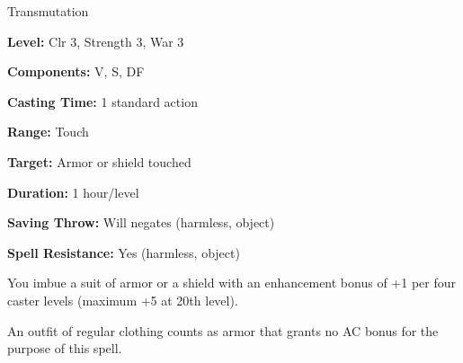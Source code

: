 
Transmutation

\textbf{Level:} Clr 3, Strength 3, War 3

\textbf{Components:} V, S, DF

\textbf{Casting Time:} 1 standard action

\textbf{Range:} Touch

\textbf{Target:} Armor or shield touched

\textbf{Duration:} 1 hour/level

\textbf{Saving Throw:} Will negates (harmless, object)

\textbf{Spell Resistance:} Yes (harmless, object)

You imbue a suit of armor or a shield with an enhancement bonus of +1 per four 
caster levels (maximum +5 at 20th level).

An outfit of regular clothing counts as armor that grants no AC bonus for the purpose 
of this spell.

